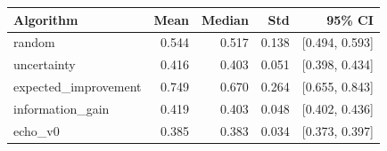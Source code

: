 \begin{tabular}{lrrrr}
\hline
Algorithm & Mean & Median & Std & 95\% CI \\
\hline
random & 0.544 & 0.517 & 0.138 & [0.494, 0.593] \\
uncertainty & 0.416 & 0.403 & 0.051 & [0.398, 0.434] \\
expected\_improvement & 0.749 & 0.670 & 0.264 & [0.655, 0.843] \\
information\_gain & 0.419 & 0.403 & 0.048 & [0.402, 0.436] \\
echo\_v0 & 0.385 & 0.383 & 0.034 & [0.373, 0.397] \\
\hline
\end{tabular}
